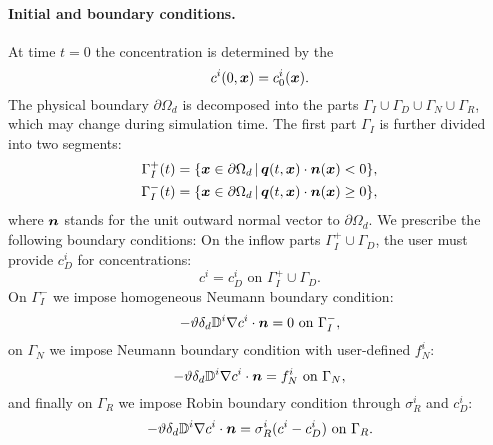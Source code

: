 


\paragraph{Initial and boundary conditions.}
At time $t=0$ the concentration is determined by the 
$$ c^i(0,\mathbf{\boldsymbol{x}}) = c^i_0(\mathbf{\boldsymbol{x}}). $$
The physical boundary $\partial\Omega_d$ is decomposed into the parts $\Gamma_I\cup\Gamma_D\cup\Gamma_N\cup\Gamma_R$, which may change during simulation time.
The first part $\Gamma_I$ is further divided into two segments:
\begin{align*}
\Gamma_I^+(t) &= \{\mathbf{\boldsymbol{x}}\in \partial\Omega_d\,|\, \mathbf{\boldsymbol{q}}(t,\mathbf{\boldsymbol{x}})\cdot\mathbf{\boldsymbol{n}}(\mathbf{\boldsymbol{x}})<0\},\\
\Gamma_I^-(t) &= \{\mathbf{\boldsymbol{x}}\in \partial\Omega_d\,|\, \mathbf{\boldsymbol{q}}(t,\mathbf{\boldsymbol{x}})\cdot\mathbf{\boldsymbol{n}}(\mathbf{\boldsymbol{x}})\ge 0\},
\end{align*}
where $\mathbf{\boldsymbol{n}}$ stands for the unit outward normal vector to $\partial\Omega_d$.
We prescribe the following boundary conditions:
On the inflow parts $\Gamma_I^+\cup\Gamma_D$, the user must provide  $c_D^i$ for concentrations:
$$ c^i = c^i_D \mbox{ on }\Gamma_I^+\cup\Gamma_D. $$
On $\Gamma_I^-$ we impose homogeneous Neumann boundary condition:
$$ -\vartheta\delta_d{{\mathbb{D}}}^i\nabla c^i\cdot\mathbf{\boldsymbol{n}} = 0 \mbox{ on }\Gamma_I^-, $$
on $\Gamma_N$ we impose Neumann boundary condition with user-defined  $f^i_N$:
$$ -\vartheta\delta_d{{\mathbb{D}}}^i\nabla c^i\cdot\mathbf{\boldsymbol{n}} = f^i_N \mbox{ on }\Gamma_N, $$
and finally on $\Gamma_R$ we impose Robin boundary condition through  $\sigma^i_R$ and  $c^i_D$:
$$ -\vartheta\delta_d{{\mathbb{D}}}^i\nabla c^i\cdot\mathbf{\boldsymbol{n}} = \sigma^i_R(c^i-c^i_D) \mbox{ on }\Gamma_R. $$






